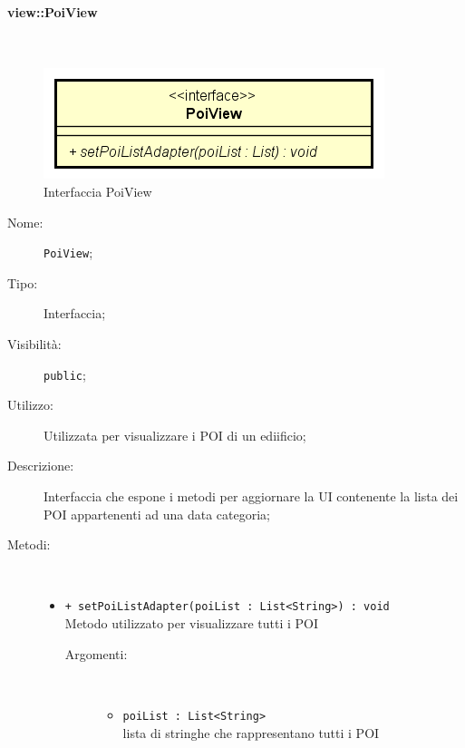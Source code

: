 \documentclass[../DefinizioneDiProdotto.tex]{subfiles}
\begin{document}
\paragraph{view::PoiView}
\
\begin{figure}[H]
	\centering
	\includegraphics[width=\maxwidth]{img/PoiView.png}
	\caption{Interfaccia PoiView}\label{fig:view::PoiView} 
\end{figure}
\begin{description}
	\item[Nome:] \texttt{PoiView};
	\item[Tipo:] Interfaccia;
	\item[Visibilità:] \texttt{public};
	\item[Utilizzo:] Utilizzata per visualizzare i POI di un ediificio;
	\item[Descrizione:] Interfaccia che espone i metodi per aggiornare la UI contenente la lista dei POI appartenenti ad una data categoria;
	\item[Metodi:] \
	\begin{itemize}
		\item \texttt{+ setPoiListAdapter(poiList : List<String>) : void}\\
		Metodo utilizzato per visualizzare tutti i POI
		\begin{description}
			\item[Argomenti:] \
			\begin{itemize}
				\item \texttt{poiList : List<String>}\\
				lista di stringhe che rappresentano tutti i POI\end{itemize}
		\end{description}
	\end{itemize}
\end{description}
\end{document}
